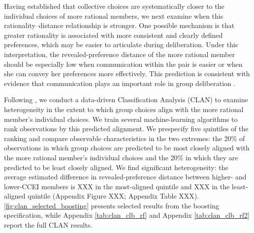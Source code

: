 \documentclass[11 pt]{article}
\begin{document}
Having established that collective choices are systematically closer to the individual choices of more rational members, we next examine when this rationality--distance relationship is stronger. One possible mechanism is that greater rationality is associated with more consistent and clearly defined preferences, which may be easier to articulate during deliberation. Under this interpretation, the revealed-preference distance of the more rational member should be especially low when communication within the pair is easier or when she can convey her preferences more effectively. This prediction is consistent with evidence that communication plays an important role in group deliberation \citep[e.g.,][]{burnstein1975what, goeree2011experimental}.

Following \citet{chernozhukov2018generic}, we conduct a data-driven Classification Analysis (CLAN) to examine heterogeneity in the extent to which group choices align with the more rational member's individual choices. We train several machine-learning algorithms to rank observations by this predicted alignment. We prespecify five quintiles of the ranking and compare observable characteristics in the two extremes: the 20\% of observations in which group choices are predicted to be most closely aligned with the more rational member's individual choices and the 20\% in which they are predicted to be least closely aligned. We find significant heterogeneity: the average estimated difference in revealed-preference distance between higher- and lower-CCEI members is XXX in the most-aligned quintile and XXX in the least-aligned quintile (Appendix Figure XXX; Appendix Table XXX). \autoref{fig:clan_selected_boosting} presents selected results from the boosting specification, while Appendix \autoref{tab:clan_clb_rf} and Appendix \autoref{tab:clan_clb_rf2} report the full CLAN results.

\end{document}
